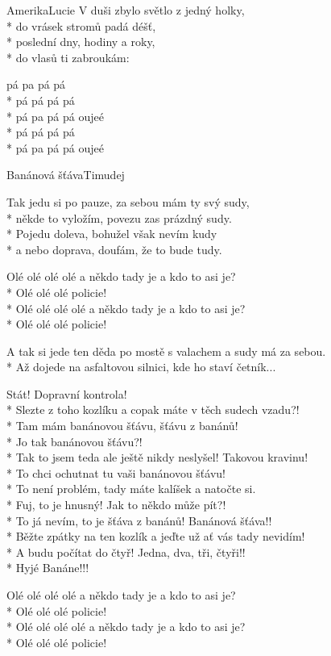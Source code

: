 \documentclass[10.5pt]{book}
\begin{document}
\begin{poem}{Amerika}{Lucie}
V duši zbylo světlo z jedný holky,\\*
do vrásek stromů padá déšť,\\*
poslední dny, hodiny a roky,\\*
do vlasů ti zabroukám:

pá pa pá pá\\*
pá pá pá pá\\*
pá pa pá pá oujeé\\*
pá pá pá pá\\*
pá pa pá pá oujeé

\end{poem}

\begin{poem}{Banánová šťáva}{Timudej}

\settowidth{\versewidth}{A tak si jede ten děda po mostě s valachem a sudy má za sebou.}

Tak jedu si po pauze, za sebou mám ty svý sudy,\\*
někde to vyložím, povezu zas prázdný sudy.\\*
Pojedu doleva, bohužel však nevím kudy\\*
a nebo doprava, doufám, že to bude tudy.

Olé olé olé olé a někdo tady je a kdo to asi je?\\*
Olé olé olé policie!\\*
Olé olé olé olé a někdo tady je a kdo to asi je?\\*
Olé olé olé policie!

A tak si jede ten děda po mostě s valachem a sudy má za sebou.\\*
Až dojede na asfaltovou silnici, kde ho staví četník...

Stát! Dopravní kontrola!\\*
Slezte z toho kozlíku a copak máte v těch sudech vzadu?!\\*
Tam mám banánovou šťávu, šťávu z banánů!\\*
Jo tak banánovou šťávu?!\\*
Tak to jsem teda ale ještě nikdy neslyšel! Takovou kravinu!\\*
To chci ochutnat tu vaši banánovou šťávu!\\*
To není problém, tady máte kalíšek a natočte si.\\*
Fuj, to je hnusný! Jak to někdo může pít?!\\*
To já nevím, to je šťáva z banánů! Banánová šťáva!!\\*
Běžte zpátky na ten kozlík a jeďte už ať vás tady nevidím!\\*
A budu počítat do čtyř! Jedna, dva, tři, čtyři!!\\*
Hyjé Banáne!!!

Olé olé olé olé a někdo tady je a kdo to asi je?\\*
Olé olé olé policie!\\*
Olé olé olé olé a někdo tady je a kdo to asi je?\\*
Olé olé olé policie!

\end{poem}
\end{document}
